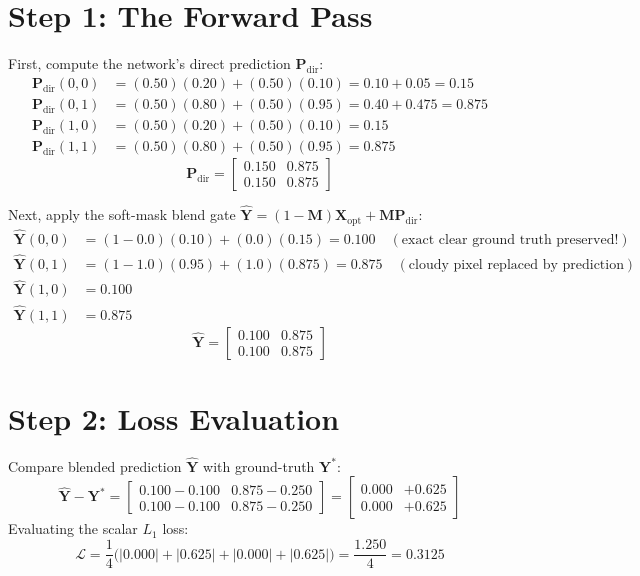 \section{Step 1: The Forward Pass}
First, compute the network's direct prediction $\mathbf{P}_{\text{dir}}$:
\begin{align*}
\mathbf{P}_{\text{dir}}(0, 0) &= (0.50)(0.20) + (0.50)(0.10) = 0.10 + 0.05 = \mathbf{0.15} \\
\mathbf{P}_{\text{dir}}(0, 1) &= (0.50)(0.80) + (0.50)(0.95) = 0.40 + 0.475 = \mathbf{0.875} \\
\mathbf{P}_{\text{dir}}(1, 0) &= (0.50)(0.20) + (0.50)(0.10) = \mathbf{0.15} \\
\mathbf{P}_{\text{dir}}(1, 1) &= (0.50)(0.80) + (0.50)(0.95) = \mathbf{0.875}
\end{align*}
\[
\mathbf{P}_{\text{dir}} = \begin{bmatrix} 0.150 & 0.875 \\ 0.150 & 0.875 \end{bmatrix}
\]

Next, apply the soft-mask blend gate $\hat{\mathbf{Y}} = (1 - \mathbf{M})\mathbf{X}_{\text{opt}} + \mathbf{M}\mathbf{P}_{\text{dir}}$:
\begin{align*}
\hat{\mathbf{Y}}(0, 0) &= (1 - 0.0)(0.10) + (0.0)(0.15) = \mathbf{0.100} \quad (\text{exact clear ground truth preserved!}) \\
\hat{\mathbf{Y}}(0, 1) &= (1 - 1.0)(0.95) + (1.0)(0.875) = \mathbf{0.875} \quad (\text{cloudy pixel replaced by prediction}) \\
\hat{\mathbf{Y}}(1, 0) &= \mathbf{0.100} \\
\hat{\mathbf{Y}}(1, 1) &= \mathbf{0.875}
\end{align*}
\[
\hat{\mathbf{Y}} = \begin{bmatrix} 0.100 & 0.875 \\ 0.100 & 0.875 \end{bmatrix}
\]

\section{Step 2: Loss Evaluation}
Compare blended prediction $\hat{\mathbf{Y}}$ with ground-truth $\mathbf{Y}^*$:
\[
\hat{\mathbf{Y}} - \mathbf{Y}^* = \begin{bmatrix} 0.100 - 0.100 & 0.875 - 0.250 \\ 0.100 - 0.100 & 0.875 - 0.250 \end{bmatrix} = \begin{bmatrix} 0.000 & +0.625 \\ 0.000 & +0.625 \end{bmatrix}
\]
Evaluating the scalar $L_1$ loss:
\[
\mathcal{L} = \frac{1}{4} \big( |0.000| + |0.625| + |0.000| + |0.625| \big) = \frac{1.250}{4} = \mathbf{0.3125}
\]

